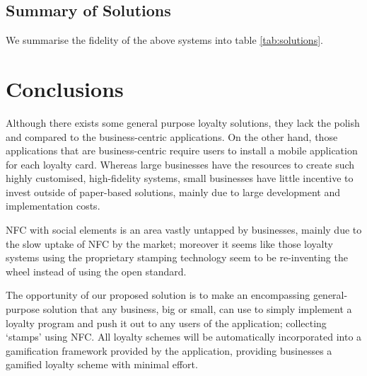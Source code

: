 \subsection{Summary of Solutions}
We summarise the fidelity of the above systems into table \ref{tab:solutions}.

\begin{table}[h]
\caption{A summary of the solutions discussed}
\label{tab:solutions}
\end{table}

\newpage
\section{Conclusions}
Although there exists some general purpose loyalty solutions, they lack the polish and compared to the business-centric applications. On the other hand, those applications that are business-centric require users to install a mobile application for each loyalty card. Whereas large businesses have the resources to create such highly customised, high-fidelity systems, small businesses have little incentive to invest outside of paper-based solutions, mainly due to large development and implementation costs.

NFC with social elements is an area vastly untapped by businesses, mainly due to the slow uptake of NFC by the market; moreover it seems like those loyalty systems using the proprietary stamping technology seem to be re-inventing the wheel instead of using the open standard.

The opportunity of our proposed solution is to make an encompassing general-purpose solution that any business, big or small, can use to simply implement a loyalty program and push it out to any users of the application; collecting `stamps' using NFC. All loyalty schemes will be automatically incorporated into a gamification framework provided by the application, providing businesses a gamified loyalty scheme with minimal effort.